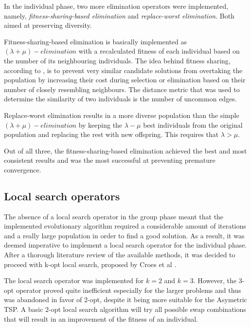 \documentclass[a4paper,10pt]{article}
\newcommand{\ReplaceMe}[1]{{\color{blue}#1}}
\begin{document}
In the individual phase, two more elimination operators were implemented, namely, \textit{fitness-sharing-based elimination} and \textit{replace-worst elimination}. Both aimed at preserving diversity.

Fitness-sharing-based elimination is basically implemented as $(\lambda+\mu)-elimination$ with a recalculated fitness of each individual based on the number of its neighbouring individuals. The idea behind fitness sharing, according to \cite{eiben}, is to prevent very similar candidate solutions from overtaking the population by increasing their cost during selection or elimination based on their number of closely resembling neighbours. The distance metric that was used to determine the similarity of two individuals is the number of uncommon edges.

Replace-worst elimination results in a more diverse population than the simple $(\lambda+\mu)-elimination$ by keeping the $\lambda-\mu$ best individuals from the original population and replacing the rest with new offspring. This requires that $\lambda > \mu$.

Out of all three, the fitness-sharing-based elimination achieved the best and most consistent results and was the most successful at preventing premature convergence.

\subsection{Local search operators} \label{ss:local_search}

The absence of a local search operator in the group phase meant that the implemented evolutionary algorithm required a considerable amount of iterations and a really large population in order to find a good solution. As a result, it was deemed imperative to implement a local search operator for the individual phase. After a thorough literature review of the available methods, it was decided to proceed with k-opt local search, proposed by Croes et al \cite{k-opt}.

The local search operator was implemented for $k=2$ and $k=3$. However, the 3-opt operator proved quite inefficient especially for the larger problems and thus was abandoned in favor of 2-opt, despite it being more suitable for the Asymetric TSP. A basic 2-opt local search algorithm will try all possible swap combinations that will result in an improvement of the fitness of an individual.
\end{document}
